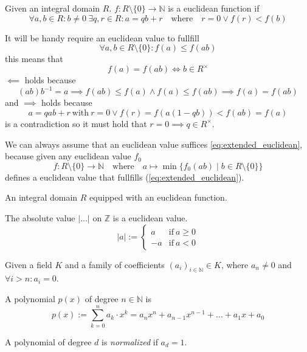 \begin{definition}
   Given an integral domain \(R\).
   \(f: R \setminus \{0\} \to \mathbb{N}\) is a euclidean function if
   \[\forall a, b \in R: b \neq 0~\exists q, r \in R: a = qb + r \quad\text{where}\quad r = 0 \lor f(r) < f(b)\]
\end{definition}
\begin{remark}
   It will be handy require an euclidean value to fullfill
   \begin{equation}\label{eq:extended_euclidean}
      \forall a,b \in R \setminus \{0\}: f(a) \leq f(ab)
   \end{equation}
   this means that
   \[f(a) = f(ab) \iff b \in R^{\times}\]
   \(\impliedby\) holds because
   \[(ab)b^{-1} = a \implies f(ab) \leq f(a) \land f(a) \leq f(ab) \implies f(a) = f(ab)\]
   and \(\implies\) holds because
   \[a = qab + r~\text{with}~r=0 \lor f(r) = f(a(1-qb)) < f(ab) = f(a)\]
   is a contradiction so it must hold that \(r = 0 \implies q \in R^{\times}\).

   We can always assume that an euclidean value suffices \cref{eq:extended_euclidean}, because given any euclidean value \(f_0\)
   \[f: R \setminus \{0\} \to \mathbb{N} \quad\text{where}\quad a \mapsto \min\{f_0(ab) \mid b \in R \setminus \{0\}\}\]
   defines a euclidean value that fullfills (\ref{eq:extended_euclidean}).
\end{remark}

\begin{definition}
   An integral domain \(R\) equipped with an euclidean function.
\end{definition}

\begin{proposition}
   The absolute value \(|\ldots|\) on \(\mathbb{Z}\) is a euclidean value.
   \[|a| := \begin{cases} a & \text{if}~a \geq 0\\ -a & \text{if}~a < 0\end{cases}\]
\end{proposition}

\begin{definition}[Polynomial]
   Given a field \(K\) and a family of coefficients \((a_i)_{i \in \mathbb{N}} \in K\), where \(a_n \neq 0\) and \(\forall i > n: a_i = 0\).

   A polynomial \(p(x)\) of degree \(n \in \mathbb{N}\) is
   \[p(x) := \sum_{k=0}^n a_k \cdot x^k = a_nx^n + a_{n-1}x^{n-1} + \ldots + a_1x + a_0\]
\end{definition}
\begin{remark}
   A polynomial of degree \(d\) is \textit{normalized} if \(a_d = 1\).
\end{remark}

